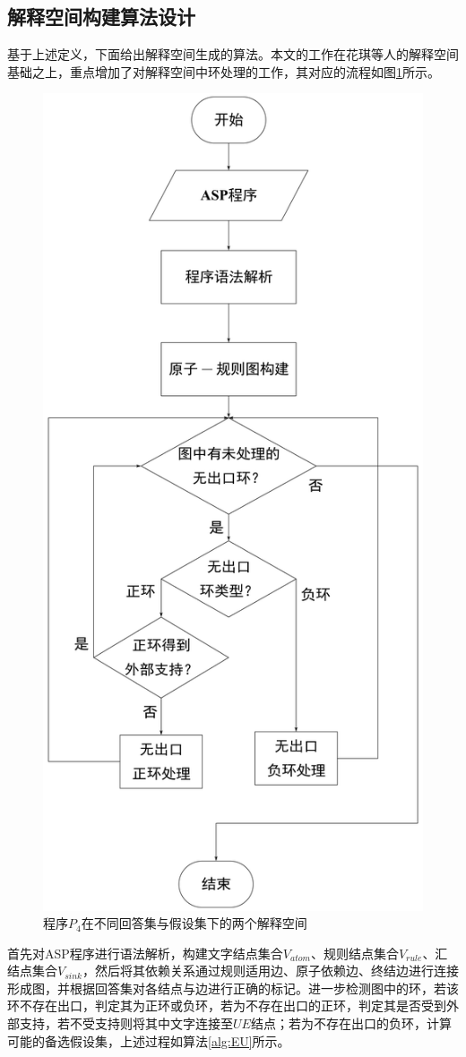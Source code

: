 \subsection{解释空间构建算法设计}
基于上述定义，下面给出解释空间生成的算法。本文的工作在花琪等人的解释空间\cite{huaqi2018lp}基础之上，重点增加了对解释空间中环处理的工作，其对应的流程如图\ref{fig:3_8}所示。
\begin{figure}[!h]
    \centering 
    \includegraphics[height=0.9\textwidth, valign=c]{figures/解释空间构建.jpg}
    \caption{程序\hyperref[prg:p_4]{$P_4$}在不同回答集与假设集下的两个解释空间}
    \label{fig:3_8}
\end{figure}

首先对ASP程序进行语法解析，构建文字结点集合$V_{atom}$、规则结点集合$V_{rule}$、汇结点集合$V_{sink}$，然后将其依赖关系通过规则适用边、原子依赖边、终结边进行连接形成图，并根据回答集对各结点与边进行正确的标记。进一步检测图中的环，若该环不存在出口，判定其为正环或负环，若为不存在出口的正环，判定其是否受到外部支持，若不受支持则将其中文字连接至$UE$结点；若为不存在出口的负环，计算可能的备选假设集，上述过程如算法\ref{alg:EU}所示。

